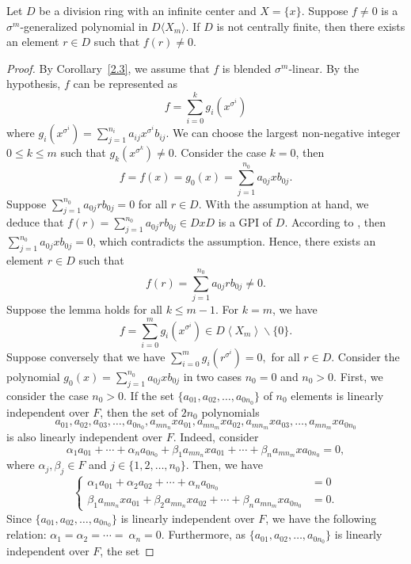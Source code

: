 \documentclass{cimart}
\begin{document}
\begin{lemma}\label{2.4}
	Let $D$ be a division ring with an infinite center and $X=\{x\}$. Suppose $f\neq 0$ is a $\sigma^m$-generalized polynomial in $D\langle X_m\rangle$. If $D$ is not centrally finite, then there exists an element $r\in D$ such that $f(r)\neq 0$.
\end{lemma}
\begin{proof} By Corollary~\ref{2.3}, we assume that $f$ is blended $\sigma^m$-linear. By the hypothesis, $f$ can be represented as
	$$f=\sum_{i=0}^kg_i(x^{\sigma^i})$$
	where $g_i(x^{\sigma^i})=\sum_{j=1}^{n_i}a_{ij}x^{\sigma^i}b_{ij}$.
	We can choose the largest non-negative integer $0\leq k\leq m$ such that $g_k(x^{\sigma^k})\neq 0$. Consider the case $k=0$, then
	$$f=f(x)=g_0(x)=\sum_{j=1}^{n_0}a_{0j}xb_{0j}.$$
	Suppose $\sum_{j=1}^{n_0}a_{0j}rb_{0j}=0$ for all $r\in D$. With the assumption at hand, we deduce that $f(r)=\sum_{j=1}^{n_0}a_{0j}rb_{0j}\in DxD$ is a GPI of $D$. According to \cite[Corollary 6.1.3]{k}, then $\sum_{j=1}^{n_0}a_{0j}xb_{0j}= 0$, which contradicts the assumption. Hence, there exists an element $r\in D$ such that
	$$f(r)=\sum_{j=1}^{n_0}a_{0j}rb_{0j}\neq 0.$$
	Suppose the lemma holds for all $k\leq m-1$. For $k=m$, we have
	$$f =\sum _{i=0}^{m}g_i(x^{\sigma ^{i}})\in D\left\langle X_m\right\rangle\backslash\{0\}.$$
	Suppose conversely that we have
	$\sum _{i=0}^{m}g_i(r^{\sigma ^{i}})= 0,$ for all $r\in D$. Consider the polynomial $g_0(x)=\sum^{n_0}_{j=1}  a_{0j}xb_{0j}$ in two cases $n_{0}=0$ and $n_{0}>0$. First, we consider the case $n_0>0$. If the set $\{a_{01}, a_{02}, \dots, a_{0n_0}\}$ of $n_0$ elements is linearly independent over $F$, then the set of $2 n_0$ polynomials
	\[
    a_{01}, a_{02}, a_{03}, \dots, a_{0n_0}, a_{mn_n}xa_{01}, a_{mn_m}xa_{02}, a_{mn_m}xa_{03},\dots,  a_{mn_m}xa_{0n_0}
    \]
	is also linearly independent over $F$.
	Indeed, consider
	\[
    \alpha_{1} a_{01}+\cdots +\alpha_{n}a_{0n_0}+\beta_1 a_{mn_n}xa_{01}+\cdots+\beta_n a_{mn_m}xa_{0n_0} =0,
    \]
	where $\alpha_j, \beta_j\in F$ and $j\in\{1, 2, \dots,n_0\}$. Then, we have
	\[
    \begin{cases}\alpha_1a_{01}+\alpha_2 a_{02}+\cdots +\alpha_{n}a_{0n_0}&=0 \\ \beta_1 a_{mn_n}xa_{01}+\beta_2 a_{mn_n}xa_{02}+\cdots+	\beta_n a_{mn_m}xa_{0n_0} &= 0.\end{cases}
    \]
	Since $\{a_{01}, a_{02}, \dots, a_{0n_0}\}$ is linearly independent over $F$, we have the following relation: $\alpha_1=\alpha_2=\cdots =\ \alpha_n=0.$ Furthermore, as $\{a_{01}, a_{02}, \dots, a_{0n_0}\}$ is linearly independent over $F$, the set 

\end{proof}
\end{document}
